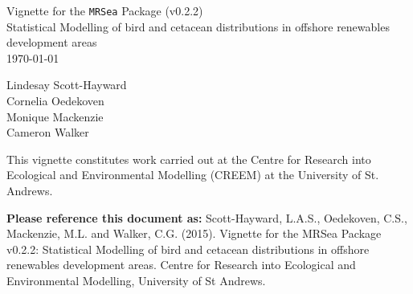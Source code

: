 \documentclass[10pt, a4paper]{article}
\begin{document}
\begin{titlepage}


\begin{center}
\vspace* {0.70 in}

\noindent\makebox[\linewidth]{\rule{\paperwidth}{0.4pt}}

\huge{Vignette for the {\tt MRSea} Package (v0.2.2)}\\[0.5 cm]
\Large{Statistical Modelling of bird and cetacean distributions in offshore renewables development areas}\\
\vspace{0.3 in}
\today

\noindent\makebox[\linewidth]{\rule{\paperwidth}{0.4pt}}


\vspace{1 in}
\Large{Lindesay Scott-Hayward}\\
\Large{Cornelia Oedekoven}\\
\Large{Monique Mackenzie}\\
\Large{Cameron Walker}\\[0.5 cm]


\vspace{1.6 in}
\begin{center}
\large{This vignette constitutes work carried out at the Centre for Research into Ecological and Environmental Modelling (CREEM) at the University of St. Andrews.}
\end{center}


\thispagestyle{empty}

\end{center}

\end{titlepage}

\vspace{0.3cm}
\textbf{Please reference this document as:}
\noindent Scott-Hayward, L.A.S., Oedekoven, C.S., Mackenzie, M.L. and Walker, C.G. (2015). Vignette for the MRSea Package v0.2.2: Statistical Modelling of bird and cetacean distributions in offshore renewables development areas. Centre for Research into Ecological and Environmental Modelling, University of St Andrews.

\begin{knitrout}
\color{fgcolor}\begin{kframe}


{\ttfamily\noindent\bfseries\color{errorcolor}{\#\# Error in ReadBib(file, .Encoding = .Encoding, header = NULL, footer = NULL, : unable to open file to read}}\end{kframe}
\end{knitrout}
\end{document}
